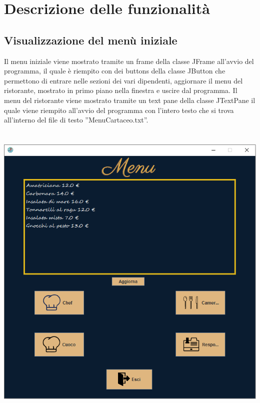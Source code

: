\documentclass{article}
\begin{document}
    \newpage
    
    \section{Descrizione delle funzionalità}
    
    \subsection{Visualizzazione del menù iniziale}
    Il menu iniziale viene mostrato tramite un frame della classe JFrame all'avvio del programma, il quale è riempito con dei buttons della classe JButton che permettono di entrare nelle sezioni dei vari dipendenti, aggiornare il menu del ristorante, mostrato in primo piano nella finestra e uscire dal programma. Il menu del ristorante viene mostrato tramite un text pane della classe JTextPane il quale viene riempito all’avvio del programma con l’intero testo che si trova all’interno del file di testo ”MenuCartaceo.txt”.
    \\\\\\
    \includegraphics[width=\textwidth]{MenuPrincipale.png}
    \newpage
    
\end{document}
